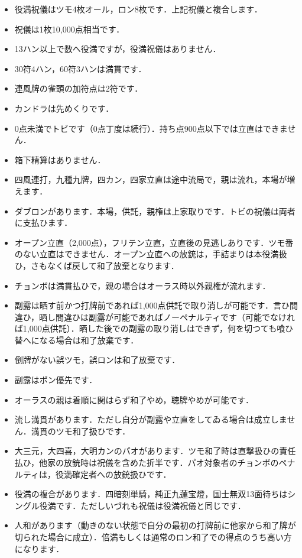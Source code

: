 \documentclass[uplatex]{jsarticle}
\begin{document}
\begin{itemize}
    \item 役満祝儀はツモ4枚オール，ロン8枚です．上記祝儀と複合します．
    \item 祝儀は1枚10,000点相当です．
    \item 13ハン以上で数へ役満ですが，役満祝儀はありません．
    \item 30符4ハン，60符3ハンは満貫です．
    \item 連風牌の雀頭の加符点は2符です．
    \item カンドラは先めくりです．
    \item 0点未満でトビです（0点丁度は続行）．持ち点900点以下では立直はできません．
    \item 箱下精算はありません．
    \item 四風連打，九種九牌，四カン，四家立直は途中流局で，親は流れ，本場が増えます．
    \item ダブロンがあります．本場，供託，親権は上家取りです．トビの祝儀は両者に支払ひます．
    \item オープン立直（2,000点），フリテン立直，立直後の見逃しありです．ツモ番のない立直はできません．オープン立直への放銃は，手詰まりは本役満扱ひ，さもなくば戻して和了放棄となります．
    \item チョンボは満貫払ひで，親の場合はオーラス時以外親権が流れます．
    \item 副露は晒す前かつ打牌前であれば1,000点供託で取り消しが可能です．言ひ間違ひ，晒し間違ひは副露が可能であればノーペナルティです（可能でなければ1,000点供託）．晒した後での副露の取り消しはできず，何を切つても喰ひ替へになる場合は和了放棄です．
    \item 倒牌がない誤ツモ，誤ロンは和了放棄です．
    \item 副露はポン優先です．
    \item オーラスの親は着順に関はらず和了やめ，聴牌やめが可能です．
    \item 流し満貫があります．ただし自分が副露や立直をしてゐる場合は成立しません．満貫のツモ和了扱ひです．
    \item 大三元，大四喜，大明カンのパオがあります．ツモ和了時は直撃扱ひの責任払ひ，他家の放銃時は祝儀を含めた折半です．パオ対象者のチョンボのペナルティは，役満確定者への放銃扱ひです．
    \item 役満の複合があります．四暗刻単騎，純正九蓮宝燈，国士無双13面待ちはシングル役満です．ただしいづれも祝儀は役満祝儀と同じです．
    \item 人和があります（動きのない状態で自分の最初の打牌前に他家から和了牌が切られた場合に成立）．倍満もしくは通常のロン和了での得点のうち高い方になります．
    \end{itemize}
\end{document}
